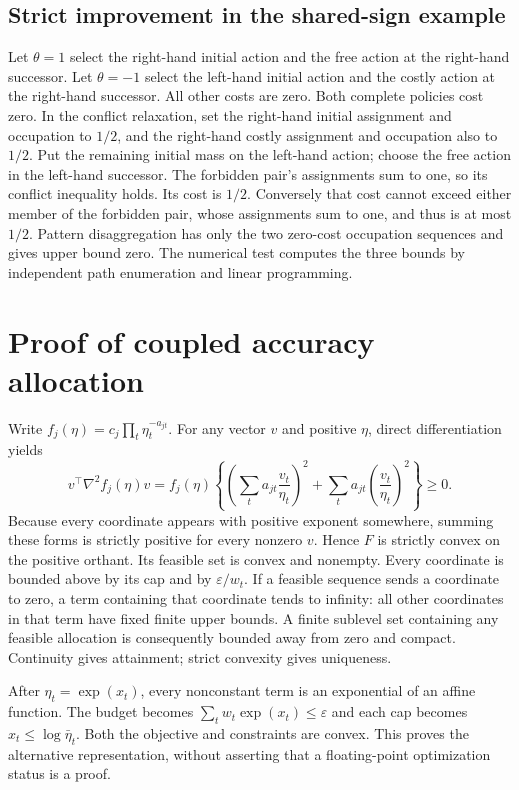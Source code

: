 \subsection{Strict improvement in the shared-sign example}
Let $\theta=1$ select the right-hand initial action and the free action at the right-hand successor. Let $\theta=-1$ select the left-hand initial action and the costly action at the right-hand successor. All other costs are zero. Both complete policies cost zero. In the conflict relaxation, set the right-hand initial assignment and occupation to $1/2$, and the right-hand costly assignment and occupation also to $1/2$. Put the remaining initial mass on the left-hand action; choose the free action in the left-hand successor. The forbidden pair's assignments sum to one, so its conflict inequality holds. Its cost is $1/2$. Conversely that cost cannot exceed either member of the forbidden pair, whose assignments sum to one, and thus is at most $1/2$. Pattern disaggregation has only the two zero-cost occupation sequences and gives upper bound zero. The numerical test computes the three bounds by independent path enumeration and linear programming.

\section{Proof of coupled accuracy allocation}\label{supp:coupled89}
Write $f_j(\eta)=c_j\prod_t\eta_t^{-a_{jt}}$. For any vector $v$ and positive $\eta$, direct differentiation yields
\[
 v^\top\nabla^2 f_j(\eta)v
 =f_j(\eta)\left\{
       \left(\sum_ta_{jt}\frac{v_t}{\eta_t}\right)^2
       +\sum_ta_{jt}\left(\frac{v_t}{\eta_t}\right)^2\right\}\ge0.
\]
Because every coordinate appears with positive exponent somewhere, summing these forms is strictly positive for every nonzero $v$. Hence $F$ is strictly convex on the positive orthant. Its feasible set is convex and nonempty. Every coordinate is bounded above by its cap and by $\varepsilon/w_t$. If a feasible sequence sends a coordinate to zero, a term containing that coordinate tends to infinity: all other coordinates in that term have fixed finite upper bounds. A finite sublevel set containing any feasible allocation is consequently bounded away from zero and compact. Continuity gives attainment; strict convexity gives uniqueness.

After $\eta_t=\exp(x_t)$, every nonconstant term is an exponential of an affine function. The budget becomes $\sum_tw_t\exp(x_t)\le\varepsilon$ and each cap becomes $x_t\le\log\bar\eta_t$. Both the objective and constraints are convex. This proves the alternative representation, without asserting that a floating-point optimization status is a proof.

